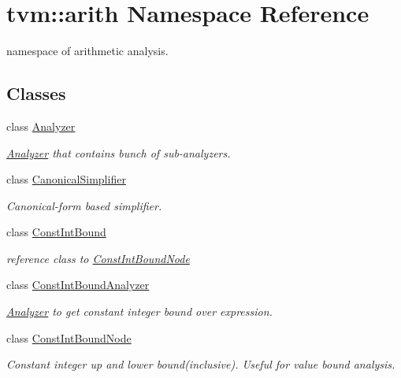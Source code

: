 \hypertarget{namespacetvm_1_1arith}{}\section{tvm\+:\+:arith Namespace Reference}
\label{namespacetvm_1_1arith}


namespace of arithmetic analysis.  


\subsection*{Classes}
\begin{DoxyCompactItemize}
\item 
class \hyperlink{classtvm_1_1arith_1_1Analyzer}{Analyzer}
\begin{DoxyCompactList}\small\item\em \hyperlink{classtvm_1_1arith_1_1Analyzer}{Analyzer} that contains bunch of sub-\/analyzers. \end{DoxyCompactList}\item 
class \hyperlink{classtvm_1_1arith_1_1CanonicalSimplifier}{Canonical\+Simplifier}
\begin{DoxyCompactList}\small\item\em Canonical-\/form based simplifier. \end{DoxyCompactList}\item 
class \hyperlink{classtvm_1_1arith_1_1ConstIntBound}{Const\+Int\+Bound}
\begin{DoxyCompactList}\small\item\em reference class to \hyperlink{classtvm_1_1arith_1_1ConstIntBoundNode}{Const\+Int\+Bound\+Node} \end{DoxyCompactList}\item 
class \hyperlink{classtvm_1_1arith_1_1ConstIntBoundAnalyzer}{Const\+Int\+Bound\+Analyzer}
\begin{DoxyCompactList}\small\item\em \hyperlink{classtvm_1_1arith_1_1Analyzer}{Analyzer} to get constant integer bound over expression. \end{DoxyCompactList}\item 
class \hyperlink{classtvm_1_1arith_1_1ConstIntBoundNode}{Const\+Int\+Bound\+Node}
\begin{DoxyCompactList}\small\item\em Constant integer up and lower bound(inclusive). Useful for value bound analysis. \end{DoxyCompactList}\item 

\end{DoxyCompactItemize}
